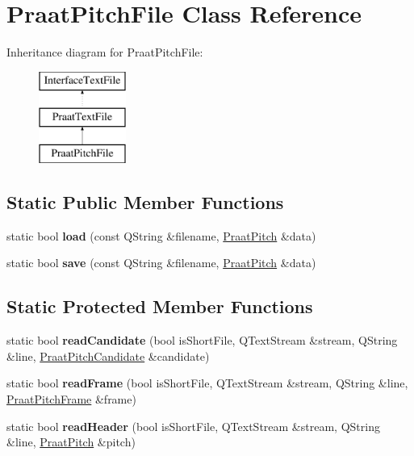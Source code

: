 \hypertarget{class_praat_pitch_file}{}\section{Praat\+Pitch\+File Class Reference}
\label{class_praat_pitch_file}
Inheritance diagram for Praat\+Pitch\+File\+:\begin{figure}[H]
\begin{center}
\leavevmode
\includegraphics[height=3.000000cm]{class_praat_pitch_file}
\end{center}
\end{figure}
\subsection*{Static Public Member Functions}
\begin{DoxyCompactItemize}
\item 
\mbox{\label{class_praat_pitch_file_a58c09d8ffebff71331ad9fa79c33023f}} 
static bool {\bfseries load} (const Q\+String \&filename, \hyperlink{class_praat_pitch}{Praat\+Pitch} \&data)
\item 
\mbox{\label{class_praat_pitch_file_a63da273338e2f77e8c0acd9b85223191}} 
static bool {\bfseries save} (const Q\+String \&filename, \hyperlink{class_praat_pitch}{Praat\+Pitch} \&data)
\end{DoxyCompactItemize}
\subsection*{Static Protected Member Functions}
\begin{DoxyCompactItemize}
\item 
\mbox{\label{class_praat_pitch_file_aa5f1f3f5a6656f2de3e64b83b3d34729}} 
static bool {\bfseries read\+Candidate} (bool is\+Short\+File, Q\+Text\+Stream \&stream, Q\+String \&line, \hyperlink{class_praat_pitch_candidate}{Praat\+Pitch\+Candidate} \&candidate)
\item 
\mbox{\label{class_praat_pitch_file_a652069d9ff3c55c90fe436be907d5a58}} 
static bool {\bfseries read\+Frame} (bool is\+Short\+File, Q\+Text\+Stream \&stream, Q\+String \&line, \hyperlink{class_praat_pitch_frame}{Praat\+Pitch\+Frame} \&frame)
\item 
\mbox{\label{class_praat_pitch_file_a915c73418a1ad534bbc6bb1f9900f85d}} 
static bool {\bfseries read\+Header} (bool is\+Short\+File, Q\+Text\+Stream \&stream, Q\+String \&line, \hyperlink{class_praat_pitch}{Praat\+Pitch} \&pitch)
\end{DoxyCompactItemize}


